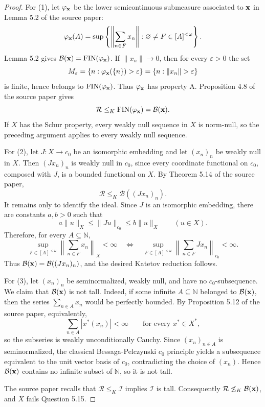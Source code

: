 \documentclass[11pt]{article}
\newcommand{\N}{\mathbb N}
\newcommand{\Rideal}{\mathcal R}
\newcommand{\Bideal}{\mathcal B}
\begin{document}
\begin{proof}
For (1), let \(\varphi_{\bf x}\) be the lower semicontinuous submeasure associated to \({\bf x}\) in Lemma 5.2 of the source paper:
\[
        \varphi_{\bf x}(A)=
        \sup\left\{\left\|\sum_{n\in F}x_n\right\|:
        \varnothing\ne F\in[A]^{<\omega}\right\}.
\]
Lemma 5.2 gives \(\Bideal({\bf x})=\mathrm{FIN}(\varphi_{\bf x})\).  If \(\|x_n\|\to0\), then for every \(\varepsilon>0\) the set
\[
        M_\varepsilon=\{n:\varphi_{\bf x}(\{n\})>\varepsilon\}
        =\{n:\|x_n\|>\varepsilon\}
\]
is finite, hence belongs to \(\mathrm{FIN}(\varphi_{\bf x})\).  Thus \(\varphi_{\bf x}\) has property A.  Proposition 4.8 of the source paper gives
\[
        \Rideal\le_K\mathrm{FIN}(\varphi_{\bf x})=\Bideal({\bf x}).
\]
If \(X\) has the Schur property, every weakly null sequence in \(X\) is norm-null, so the preceding argument applies to every weakly null sequence.

For (2), let \(J:X\to c_0\) be an isomorphic embedding and let \((x_n)_n\) be weakly null in \(X\).  Then \((Jx_n)_n\) is weakly null in \(c_0\), since every coordinate functional on \(c_0\), composed with \(J\), is a bounded functional on \(X\).  By Theorem 5.14 of the source paper,
\[
        \Rideal\le_K\Bideal((Jx_n)_n).
\]
It remains only to identify the ideal.  Since \(J\) is an isomorphic embedding, there are constants \(a,b>0\) such that
\[
        a\|u\|_X\le \|Ju\|_{c_0}\le b\|u\|_X\qquad (u\in X).
\]
Therefore, for every \(A\subseteq\N\),
\[
        \sup_{F\in[A]^{<\omega}}\left\|\sum_{n\in F}x_n\right\|_X<\infty
        \quad\Longleftrightarrow\quad
        \sup_{F\in[A]^{<\omega}}\left\|\sum_{n\in F}Jx_n\right\|_{c_0}<\infty.
\]
Thus \(\Bideal({\bf x})=\Bideal((Jx_n)_n)\), and the desired Katetov reduction follows.

For (3), let \((x_n)_n\) be seminormalized, weakly null, and have no \(c_0\)-subsequence.  We claim that \(\Bideal({\bf x})\) is not tall.  Indeed, if some infinite \(A\subseteq\N\) belonged to \(\Bideal({\bf x})\), then the series \(\sum_{n\in A}x_n\) would be perfectly bounded.  By Proposition 5.12 of the source paper, equivalently,
\[
        \sum_{n\in A}|x^*(x_n)|<\infty
        \qquad\text{for every }x^*\in X^*,
\]
so the subseries is weakly unconditionally Cauchy.  Since \((x_n)_{n\in A}\) is seminormalized, the classical Bessaga-Pelczynski \(c_0\) principle yields a subsequence equivalent to the unit vector basis of \(c_0\), contradicting the choice of \((x_n)\).  Hence \(\Bideal({\bf x})\) contains no infinite subset of \(\N\), so it is not tall.

The source paper recalls that \(\Rideal\le_K\mathcal I\) implies \(\mathcal I\) is tall.  Consequently \(\Rideal\not\le_K\Bideal({\bf x})\), and \(X\) fails Question 5.15.
\end{proof}
\end{document}

